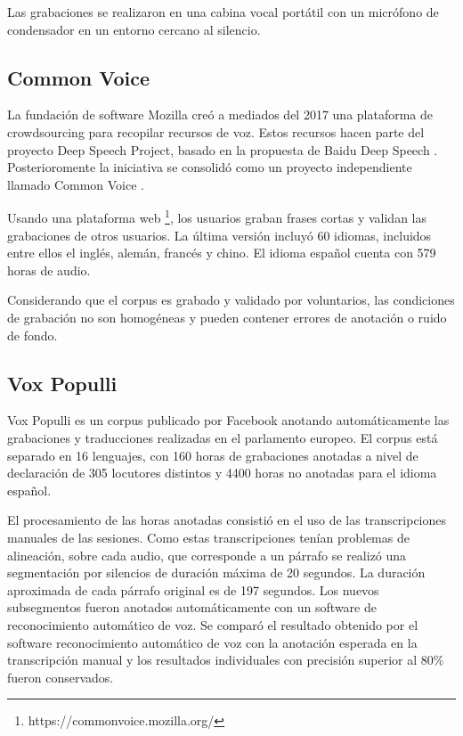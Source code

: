 Las grabaciones se realizaron en una cabina vocal portátil con un micrófono de condensador en un entorno cercano al silencio.

\subsection{Common Voice}

La fundación de software Mozilla creó a mediados del 2017 una plataforma de crowdsourcing para recopilar recursos de voz. Estos recursos hacen parte del proyecto Deep Speech Project, basado en la propuesta de Baidu Deep Speech \cite{deepspeeh}. Posterioromente la iniciativa se consolidó como un proyecto independiente llamado Common Voice \cite{Common-Voice}.

Usando una plataforma web \footnote{https://commonvoice.mozilla.org/}, los usuarios graban frases cortas y validan las grabaciones de otros usuarios. La última versión  incluyó 60 idiomas, incluidos entre ellos el inglés, alemán, francés y chino. El idioma español cuenta con 579 horas de audio.

Considerando que el corpus es grabado y validado por voluntarios, las condiciones de grabación no son homogéneas y pueden contener errores de anotación o ruido de fondo.

\subsection{Vox Populli}

Vox Populli \cite{voxpopulli} es un corpus publicado por Facebook anotando automáticamente las grabaciones y traducciones realizadas en el parlamento europeo. El corpus está separado en 16 lenguajes, con 160 horas de grabaciones anotadas a nivel de declaración de 305 locutores distintos y 4400 horas no anotadas para el idioma español. 

El procesamiento de las horas anotadas consistió en el uso de las transcripciones manuales de las sesiones. Como estas transcripciones tenían problemas de alineación, sobre cada audio, que corresponde a un párrafo se realizó una segmentación por silencios de duración máxima de 20 segundos. La duración aproximada de cada párrafo original es de 197 segundos. Los nuevos subsegmentos fueron anotados automáticamente con un software de reconocimiento automático de voz. Se comparó el resultado obtenido por el software reconocimiento automático de voz con la anotación esperada en la transcripción manual y los resultados individuales con precisión superior al 80\% fueron conservados.



